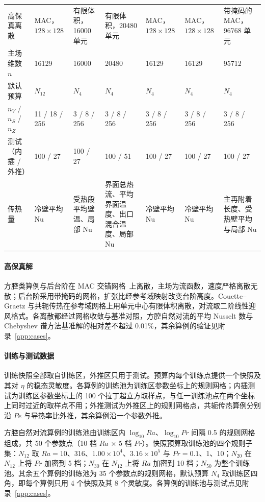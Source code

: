 \begin{table}
\begin{tabular}{p{0.085\textheight}p{0.14\textheight}p{0.135\textheight}p{0.145\textheight}p{0.14\textheight}p{0.14\textheight}p{0.15\textheight}}
高保真离散 & MAC，$128\times128$ & 有限体积，16000 单元 & 有限体积，20480 单元 & MAC，$128\times128$ & MAC，$128\times128$ & 带掩码的 MAC，96768 单元 \\
主场维数 $n$ & 16129 & 16000 & 20480 & 16129 & 16129 & 95712 \\
默认预算 & $N_{12}$ & $N_4$ & $N_4$ & $N_4$ & $N_4$ & $N_4$ \\
$n_V$ / $n_S$ / $n_Z$ & 11 / 18 / 256 & 3 / 8 / 256 & 3 / 8 / 256 & 3 / 8 / 256 & 3 / 8 / 256 & 3 / 8 / 256 \\
测试（内插 / 外推） & 100 / 27 & 100 / 27 & 100 / 51 & 100 / 27 & 100 / 27 & 100 / 27 \\
传热量 & 冷壁平均 Nu & 受热段平均壁温、局部 Nu & 界面总热流、平均界面温度、出口混合温度、局部 Nu & 冷壁平均 Nu & 冷壁平均 Nu & 主再附着长度、受热壁平均与局部 Nu \\
\bottomrule
\end{tabular}
\end{table}

\paragraph{高保真解}
方腔类算例与后台阶在 MAC 交错网格~\cite{harlow1965numerical}上离散，主场为流函数，速度严格离散无散；后台阶采用带掩码的网格，扩张比经参考域映射改变台阶高度。Couette--Graetz 与共轭传热在参考域网格上用单元中心有限体积离散，对流取二阶线性迎风格式。各离散都经过网格收敛与基准对照，方腔自然对流的平均 Nusselt 数与 Chebyshev 谱方法基准解的相对差不超过 0.01\%，其余算例的验证见附录~\ref{app:cases}。

\paragraph{训练与测试数据}
训练快照全部取自训练区，外推区只用于测试。预算内每个训练点提供一个快照及其对 $\eta$ 的稳态灵敏度。各算例的训练池为训练区参数坐标上的规则网格；内插测试为训练区参数坐标上的 100 个拉丁超立方取样点，与任一训练池点在两个坐标上同时过近的取样点不用；外推测试为外推区上的规则网格点，共轭传热算例分别沿 $Pe$ 与导热率比外推，其余算例沿一个参数外推。

方腔自然对流算例的训练池由训练区内 $\log_{10}Ra$、$\log_{10}Pr$ 间隔 0.5 的规则网格组成，共 50 个参数点（10 档 $Ra$ $\times$ 5 档 $Pr$）。快照预算取训练池的四个规则子集：$N_{12}$ 取 $Ra=10$、316、$1.00\times10^4$、$3.16\times10^5$ 与 $Pr=0.1$、1、10；$N_{20}$ 在 $N_{12}$ 上将 $Pr$ 加密到 5 档；$N_{30}$ 在 $N_{12}$ 上将 $Ra$ 加密到 10 档；$N_{50}$ 为整个训练池。其余五个算例的训练池为 35 个参数点的规则网格，默认预算 $N_4$ 取训练区四角，即每个算例只用 4 个快照及其 8 个灵敏度。各算例的训练池与测试点见附录~\ref{app:cases}。

